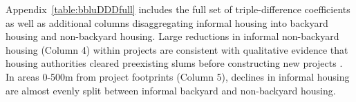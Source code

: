 \documentclass[12pt]{article}
\begin{document}

Appendix~\ref{table:bbluDDDfull} includes the full set of triple-difference coefficients as well as additional columns disaggregating informal housing into backyard housing and non-backyard housing.  Large reductions in informal non-backyard housing (Column 4) within projects are consistent with qualitative evidence that housing authorities cleared preexisting slums before constructing new projects \citep{hofmeyr2008risk}.  In areas 0-500m from project footprints (Column 5), declines in informal housing are almost evenly split between informal backyard and non-backyard housing.





\end{document}
